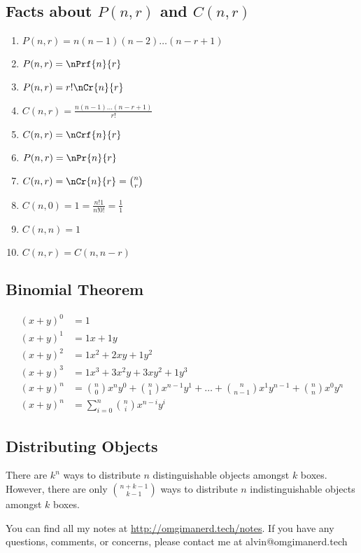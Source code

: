 \documentclass{math}
\begin{document}
\subsection*{Facts about \( P(n,r) \) and \( C(n,r) \)}
\begin{enumerate}
  \item \( P(n,r) = n(n-1)(n-2)\dots(n-r+1) \)
  \item \( P(n,r) = \nPrf{n}{r} \)
  \item \( P(n,r) = r!\nCr{n}{r} \)
  \item \( C(n,r) = \frac{n(n-1)\dots(n-r+1)}{r!} \)
  \item \( C(n,r) = \nCrf{n}{r} \)
  \item \( P(n,r) = {\nPr{n}{r}} \)
  \item \( C(n,r) = {\nCr{n}{r}} = \binom{n}{r} \)
  \item \( C(n,0) = 1 = \frac{n!1}{n!0!} = \frac{1}{1} \)
  \item \( C(n,n) = 1 \)
  \item \( C(n,r) = C(n,n-r) \)
\end{enumerate}

\subsection*{Binomial Theorem}
\begin{align*}
  (x+y)^{0} &= 1 \\
  (x+y)^{1} &= 1x+1y \\
  (x+y)^{2} &= 1x^{2}+2xy+1y^{2} \\
  (x+y)^{3} &= 1x^{3}+3x^{2}y+3xy^{2}+1y^{3} \\
  (x+y)^{n} &= \binom{n}{0}x^{n}y^{0}+\binom{n}{1}x^{n-1}y^{1}+\dots+
      \binom{n}{n-1}x^{1}y^{n-1}+\binom{n}{n}x^{0}y^{n} \\
  (x+y)^{n} &= \sum_{i=0}^{n}\binom{n}{i}x^{n-i}y^{i}
\end{align*}

\subsection*{Distributing Objects}
There are \( k^{n} \) ways to distribute \( n \) distinguishable objects amongst
\( k \) boxes. However, there are only \( \binom{n+k-1}{k-1} \) ways to
distribute \( n \) indistinguishable objects amongst \( k \) boxes.

\begin{center}
  You can find all my notes at \url{http://omgimanerd.tech/notes}. If you have
  any questions, comments, or concerns, please contact me at
  alvin@omgimanerd.tech
\end{center}
\end{document}

